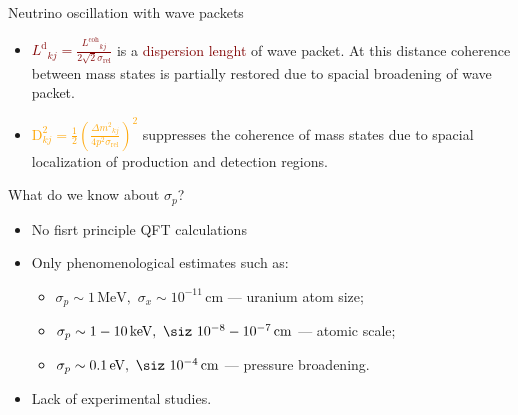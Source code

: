 \documentclass[usenames, dvipsnames]{beamer}
\newcommand{\Lcoh}{\ensuremath{L^{\text{coh}}}}
\newcommand{\Ld}{\ensuremath{L^{\text{d}}}}
\newcommand{\Dm}{\ensuremath{\Delta m^2}}
\newcommand{\Important}{\textcolor{BrickRed}}
\newcommand{\Orange}{\textcolor{Orange}}
\newcommand{\Maroon}{\textcolor{Maroon}}
\newcommand{\impitem}{\item[\Important{$\bullet$}]}
\newcommand{\orangeitem}{\item[\Orange{$\bullet$}]}
\newcommand{\pineitem}{\item[\Maroon{$\bullet$}]}
\newcommand{\sip}{\ensuremath{\sigma_p}}
\newcommand{\six}{\ensuremath{\sigma_x}}
\begin{document}
\begin{frame}[fragile]
\begin{columns}[T]
\begin{column}{.47\textwidth}
\begin{block}{Neutrino oscillation with wave packets}
\begin{itemize}
\begin{itemize}
            At this distance separation of wave packets due to different group
            velocities suppresses interference between mass states.
        \pineitem \Maroon{$\Ld_{kj}  =
            \frac{\Lcoh_{kj}}{2\sqrt{2}\sigma_{\text{rel}}}$} is a
            \Maroon{dispersion lenght} of wave packet. At this distance
             coherence between mass states is partially restored due to
             spacial broadening of wave packet.
         \orangeitem \Orange{\ensuremath{ \text{D}^2_{kj} =\frac{1}{2} \left(
             \frac{\Dm_{kj}}{4 p^2\sigma_\text{rel}} \right)^2}} 
         suppresses the coherence of mass states due to spacial localization of production and
             detection regions.
    \end{itemize}
  \end{itemize}
\end{block}


\begin{block}{What do we know about \sip?}
    \begin{itemize}
        \item No fisrt principle QFT calculations
        \item Only phenomenological estimates such as:
        \begin{itemize}
            \item $\sip \sim 1\, \text{MeV}, \,\, \six \sim 10^{-11}\, \text{cm}$
                --- uranium atom size;
            \item $\sip \sim 1-10 \, \text{keV}, \,\, \siz ~ 10^{-8} -
                10^{-7} \, \text{cm}$ --- atomic scale;
            \item $\sip \sim 0.1 \, \text{eV}, \,\, \siz ~ 10^{-4} \, \text{cm}$
                --- pressure broadening.
        \end{itemize}
        \impitem Lack of experimental studies.
    \end{itemize}
\end{block}


\end{column}
\end{columns}
\end{frame}
\end{document}
